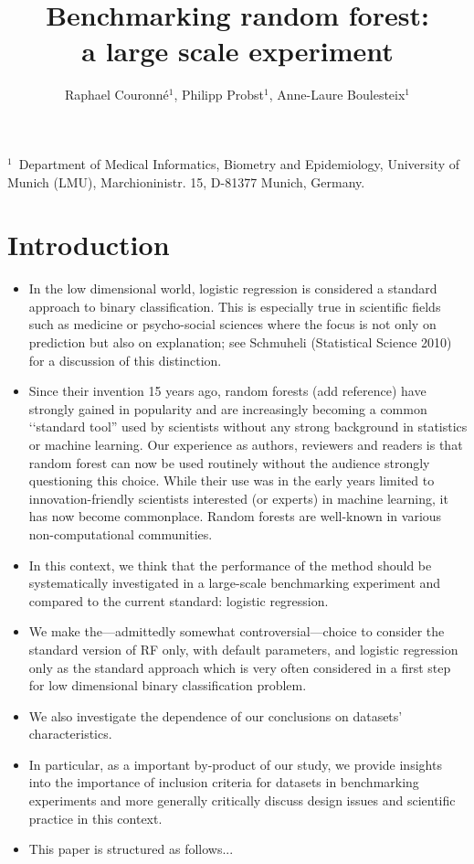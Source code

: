 \documentclass[12pt]{article}
\title{Benchmarking random forest:\\ a large scale experiment}
\author{Raphael Couronn\'e$^1$, Philipp Probst$^1$, Anne-Laure Boulesteix$^1$}
\date{}
\begin{document}

\maketitle

\noindent
$^1$\ Department of Medical Informatics, Biometry and Epidemiology, University of Munich (LMU), Marchioninistr. 15, D-81377 Munich, Germany.


\begin{abstract}

\end{abstract}


\section{Introduction}
\begin{itemize}
\item In the low dimensional world, logistic regression is considered a standard approach to binary classification. This is especially true in scientific fields such as medicine or psycho-social sciences where the focus is not only on prediction but also on explanation; see Schmuheli (Statistical Science 2010) for a discussion of this distinction.
\item Since their invention 15 years ago, random forests (add reference) have strongly gained in popularity and are increasingly becoming a common \lq\lq standard tool'' used by scientists without any strong background in statistics or machine learning. Our experience as authors, reviewers and readers is that random forest can now be used routinely without the audience strongly questioning this choice. While their use was in the early years limited to innovation-friendly scientists interested (or experts) in machine learning, it has now become commonplace. Random forests are well-known in various non-computational communities.
\item In this context, we think that the performance of the method should be systematically investigated in a large-scale benchmarking experiment and compared to the current standard: logistic regression.
\item We make the---admittedly somewhat controversial---choice to consider the standard version of RF only, with default parameters, and logistic regression only as the standard approach which is very often considered in a first step for low dimensional binary classification problem.
\item We also investigate the dependence of our conclusions on datasets' characteristics.
\item In particular, as a important by-product of our study, we provide insights into the importance of inclusion criteria for datasets in benchmarking experiments and more generally critically discuss design issues and scientific practice in this context.
\item This paper is structured as follows...
\end{itemize}
\end{document}
